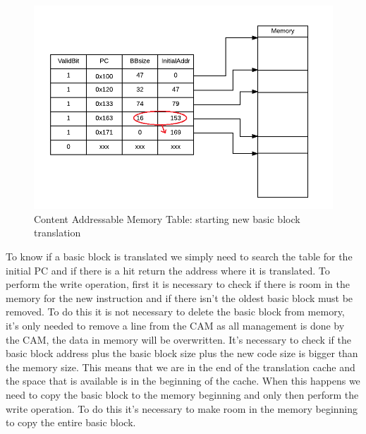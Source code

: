 \begin{figure} [h!]
	\centering
	\includegraphics[scale = 0.35]{images/CAM_new_BB.png}
	\caption{Content Addressable Memory Table: starting new basic block translation}
	\label{fig:CAMtableNewBB}
\end{figure}

To know if a basic block is translated we simply need to search the table for the initial PC and if there is a hit return the address where it is translated.
To perform the write operation, first it is necessary to check if there is room in the memory for the new instruction and if there isn't the oldest basic block must be removed. To do this it is not necessary to delete the basic block from memory, it's only needed to remove a line from the CAM as all management is done by the CAM, the data in memory will be overwritten. It's necessary to check if the basic block address plus the basic block size plus the new code size is bigger than the memory size. This means that we are in the end of the translation cache and the space that is available is in the beginning of the cache. When this happens we need to copy the basic block to the memory beginning and only then perform the write operation. To do this it's necessary to make room in the memory beginning to copy the entire basic block.


